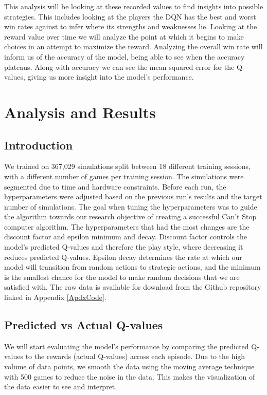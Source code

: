 \documentclass[12pt]{article}
\begin{document}
\begin{thesis}
This analysis will be looking at these recorded values to find insights into possible strategies.
This includes looking at the players the DQN has the best and worst win rates against to infer where its strengths and weaknesses lie.
Looking at the reward value over time we will analyze the point at which it begins to make choices in an attempt to maximize the reward.
Analyzing the overall win rate will inform us of the accuracy of the model, being able to see when the accuracy plateaus.
Along with accuracy we can see the mean squared error for the Q-values, giving us more insight into the model's performance.

\newpage

\section{Analysis and Results}\label{ana-res}

\subsection{Introduction}\label{introduction}

We trained on 367,029 simulations split between 18 different training sessions, with a different number of games per training session. The simulations were segmented due to time and hardware constraints. Before each run, the hyperparameters were adjusted based on the previous run's results and the target number of simulations. The goal when tuning the hyperparameters was to guide the algorithm towards our research objective of creating a successful Can't Stop computer algorithm. The hyperparameters that had the most changes are the discount factor and epsilon minimum and decay. Discount factor controls the model's predicted Q-values and therefore the play style, where decreasing it reduces predicted Q-values. Epsilon decay determines the rate at which our model will transition from random actions to strategic actions, and the minimum is the smallest chance for the model to make random decisions that we are satisfied with. The raw data is available for download from the Github repository linked in Appendix \ref{ApdxCode}.

\subsection{Predicted vs Actual Q-values}\label{predicted-vs-actual-q-values}

We will start evaluating the model's performance by comparing the predicted Q-values to the rewards (actual Q-values) across each episode. Due to the high volume of data points, we smooth the data using the moving average technique with 500 games to reduce the noise in the data. This makes the visualization of the data easier to see and interpret.


\end{thesis}
\end{document}
